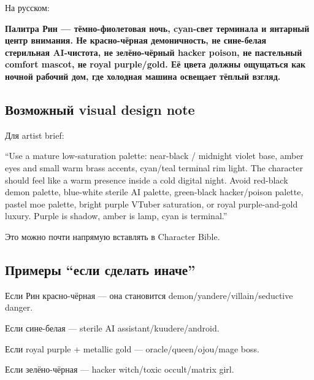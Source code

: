 На русском:

\textbf{Палитра Рин --- тёмно-фиолетовая ночь, cyan-свет терминала и
янтарный центр внимания. Не красно-чёрная демоничность, не сине-белая
стерильная AI-чистота, не зелёно-чёрный hacker poison, не пастельный
comfort mascot, не royal purple/\hspace{0pt}gold. Её цвета должны ощущаться как
ночной рабочий дом, где холодная машина освещает тёплый взгляд.}

\subsection*{Возможный visual design note}

Для artist brief:

``Use a mature low-saturation palette: near-black /\hspace{0pt} midnight violet
base, amber eyes and small warm brass accents, cyan/\hspace{0pt}teal terminal rim
light. The character should feel like a warm presence inside a cold
digital night. Avoid red-black demon palette, blue-white sterile AI
palette, green-black hacker/\hspace{0pt}poison palette, pastel moe palette, bright
purple VTuber saturation, or royal purple-and-gold luxury. Purple is
shadow, amber is lamp, cyan is terminal.''

Это можно почти напрямую вставлять в Character Bible.

\subsection*{Примеры ``если сделать иначе''}

Если Рин красно-чёрная --- она становится
demon/\hspace{0pt}yandere/\hspace{0pt}villain/\hspace{0pt}seductive danger.

Если сине-белая --- sterile AI assistant/\hspace{0pt}kuudere/\hspace{0pt}android.

Если royal purple + metallic gold --- oracle/\hspace{0pt}queen/\hspace{0pt}ojou/\hspace{0pt}mage boss.

Если зелёно-чёрная --- hacker witch/\hspace{0pt}toxic occult/\hspace{0pt}matrix girl.

